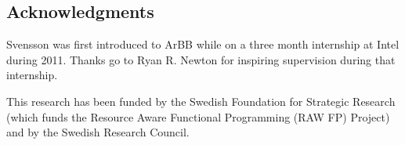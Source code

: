 %

 



\subsection*{Acknowledgments}
Svensson was first introduced to ArBB while on a three month internship at Intel
during 2011. Thanks go to Ryan R. Newton for inspiring supervision 
during that internship.

This research has been funded by the Swedish Foundation for
Strategic Research (which funds the Resource Aware Functional 
Programming (RAW FP) Project) and by the
Swedish Research Council.







